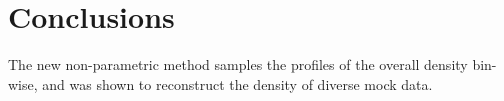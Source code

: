 \section{Conclusions}\label{sec:conclusions}

The new non-parametric method samples the profiles of the overall
density bin-wise, and was shown to reconstruct the density of diverse
mock data.


